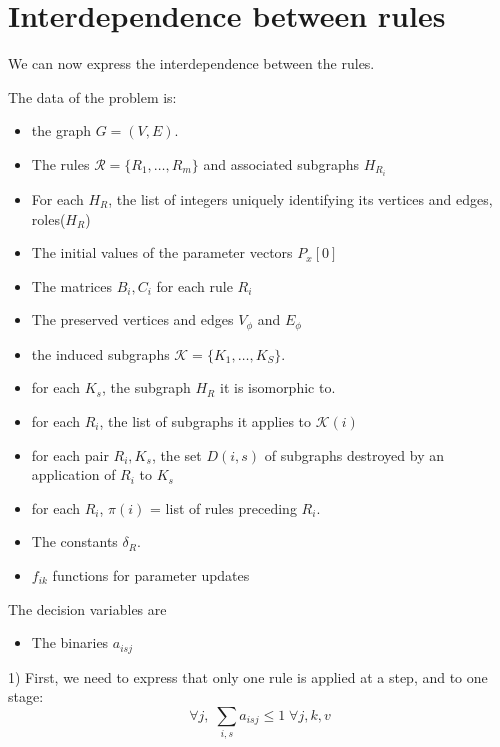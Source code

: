 \documentclass[11pt, oneside, reqno]{article}
\newcommand{\Kc}{\mathcal{K}}
\newcommand{\Rc}{\mathcal{R}}
\begin{document}
\section{Interdependence between rules}
We can now express the interdependence between the rules. 

The data of the problem is:
\begin{itemize}
	\item the graph $G = (V,E)$.
	\item The rules $\Rc = \{R_1,\ldots,R_m\}$ and associated subgraphs $H_{R_i}$
	\item For each $H_{R}$, the list of integers uniquely identifying its vertices and edges, roles($H_R$)
	\item The initial values of the parameter vectors $P_x[0]$
	\item The matrices $B_i,C_i$ for each rule $R_i$
	\item The preserved vertices and edges $V_\phi$ and $E_\phi$
	\item the induced subgraphs $\Kc = \{K_1,\ldots,K_S\}$.
	\item for each $K_s$, the subgraph $H_R$ it is isomorphic to.
	\item for each $R_i$, the list of subgraphs it applies to $\Kc(i)$
	\item for each pair $R_i,K_s$, the set $D(i,s)$ of subgraphs destroyed by an application of $R_i$ to $K_s$	
	\item for each $R_i$, $\pi(i)$ = list of rules preceding $R_i$.
	\item The constants $\delta_{R}$.
	\item $f_{ik}$ functions for parameter updates
\end{itemize}

The decision variables are
\begin{itemize}
	\item The binaries $a_{isj}$
\end{itemize}

1) First, we need to express that only one rule is applied at a step, and to one stage:
\begin{equation}
\label{eq:oneruleinstepArithm}
\forall j, \; \sum_{i,s}a_{isj}  \leq 1\; \forall j,k,v
\end{equation}
\end{document}
